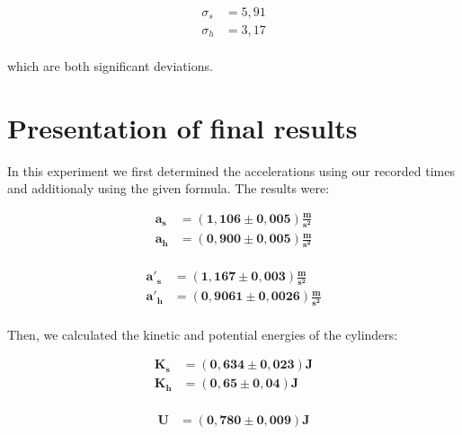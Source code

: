 \documentclass{article}
\begin{document}
\begin{equation}
    \begin{split}
        \sigma_s &= 5,91 \\
        \sigma_h &= 3,17 \\
    \end{split}
\end{equation}

which are both significant deviations.

\newpage
\section{Presentation of final results}

In this experiment we first determined the accelerations using our recorded times and additionaly using the given formula. The results were:

\begin{equation}
    \begin{split}
        \bm{a_s} &= \bm{(1,106 \pm 0,005) \frac{\textbf{m}}{\textbf{s}^2}} \\
        \bm{a_h} &= \bm{(0,900 \pm 0,005) \frac{\textbf{m}}{\textbf{s}^2}} \\        
    \end{split}
\end{equation}

\begin{equation}
    \begin{split}
        \bm{a'_s} &= \bm{(1,167 \pm 0,003) \frac{\textbf{m}}{\textbf{s}^2}} \\
        \bm{a'_h} &= \bm{(0,9061 \pm 0,0026) \frac{\textbf{m}}{\textbf{s}^2}} \\
    \end{split}
\end{equation}

Then, we calculated the kinetic and potential energies of the cylinders:

\begin{equation}
    \begin{split}
        \bm{K_s} &= \bm{(0,634 \pm 0,023)} \textbf{J} \\
        \bm{K_h} &= \bm{(0,65 \pm 0,04)} \textbf{J} \\        
    \end{split}
\end{equation}

\begin{equation}
    \begin{split}
        \bm{U} &= \bm{(0,780 \pm 0,009)} \textbf{J}
    \end{split}
\end{equation}
\end{document}
